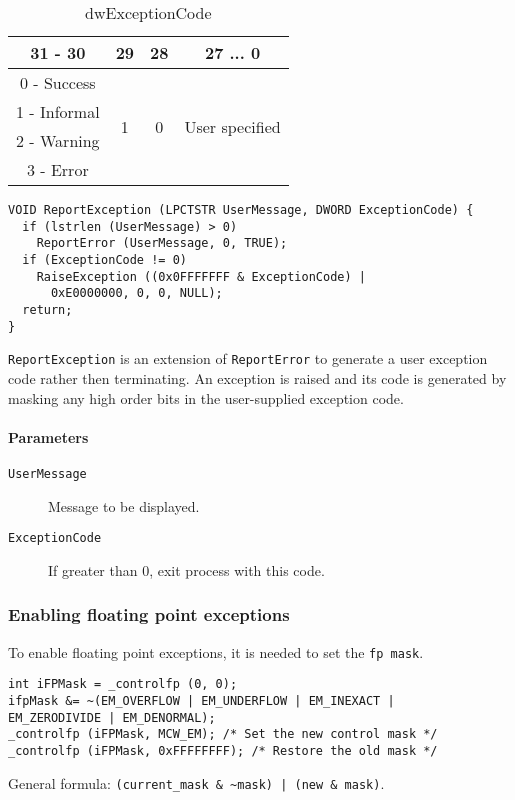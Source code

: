 \begin{table}
\centering
\label{tab:dwExceptionCode}
\begin{tabular}{|c|c|c|c|}
\hline 
31 - 30 & 29 & 28 & 27 ... 0 \\ 
\hline 
0 - Success & \multirow{4}{*}{1} & \multirow{4}{*}{0} & \multirow{4}{*}{User specified} \\ 
\cline{1-1} 
1 - Informal & & & \\ 
\cline{1-1} 
2 - Warning & & & \\ 
\cline{1-1} 
3 - Error & & & \\ 
\hline
\end{tabular} 
\caption{dwExceptionCode}
\end{table}

\begin{verbatim}
VOID ReportException (LPCTSTR UserMessage, DWORD ExceptionCode) {
  if (lstrlen (UserMessage) > 0)
    ReportError (UserMessage, 0, TRUE);
  if (ExceptionCode != 0)
    RaiseException ((0x0FFFFFFF & ExceptionCode) |
      0xE0000000, 0, 0, NULL);
  return;
}
\end{verbatim}
\texttt{ReportException} is an extension of \texttt{ReportError} to generate a user exception code rather then terminating. An exception is raised and its code is generated by masking any high order bits in the user-supplied exception code.

\paragraph{Parameters}
\begin{description}
\item [\texttt{UserMessage}] Message to be displayed.
\item [\texttt{ExceptionCode}] If greater than 0, exit process with this code.
\end{description}

\subsubsection{Enabling floating point exceptions}
To enable floating point exceptions, it is needed to set the \texttt{fp mask}.
\begin{verbatim}
int iFPMask = _controlfp (0, 0);
ifpMask &= ~(EM_OVERFLOW | EM_UNDERFLOW | EM_INEXACT |
EM_ZERODIVIDE | EM_DENORMAL);
_controlfp (iFPMask, MCW_EM); /* Set the new control mask */
_controlfp (iFPMask, 0xFFFFFFFF); /* Restore the old mask */
\end{verbatim}
General formula: \texttt{(current\_mask \& \~{}mask) | (new \& mask)}.

